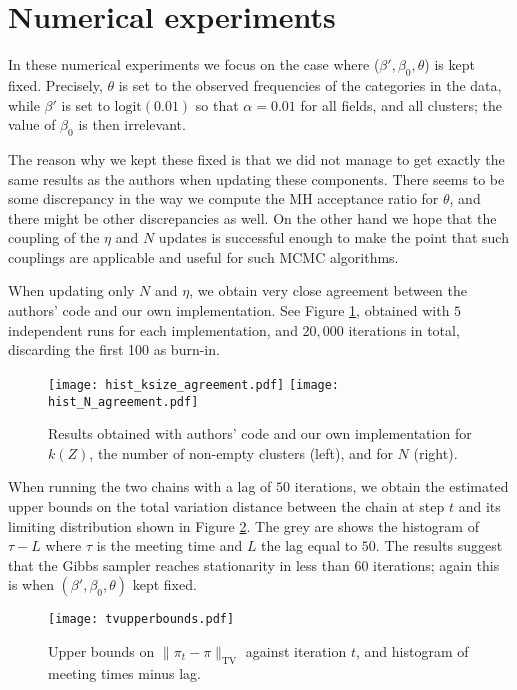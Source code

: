 \documentclass{article}
\begin{document}
\section{Numerical experiments}

In these numerical experiments we focus on 
the case where ($\beta',\beta_0,\theta$) is kept fixed.
Precisely, $\theta$ is set to the observed frequencies
of the categories in the data,
while $\beta'$ is set to $\text{logit}(0.01)$ so that
$\alpha = 0.01$ for all fields, and all clusters; the value
of $\beta_0$ is then irrelevant.

The reason why we kept these fixed is that we did not manage
to get exactly the same results as the authors when 
updating these components. There seems to be some discrepancy 
in the way we compute the MH acceptance ratio for $\theta$,
and there might be other discrepancies as well. On the other
hand we hope that the coupling of the $\eta$ and $N$
updates is successful enough to make the point that such 
couplings are applicable and useful for such MCMC algorithms.

When updating only $N$ and $\eta$,
we obtain very close agreement between the authors' code
and our own implementation. See Figure \ref{fig:agreementNksize},
obtained with $5$ independent runs for each implementation,
and $20,000$ iterations in total, discarding the first 100
as burn-in.

\begin{figure}
    \centering
    \texttt{[image: hist\_ksize\_agreement.pdf]}
    \hspace*{1cm}
    \texttt{[image: hist\_N\_agreement.pdf]}
    \caption{Results obtained with authors' code and our own implementation for $k(Z)$, the number of non-empty 
    clusters (left), and for $N$ (right).}
    \label{fig:agreementNksize}
\end{figure}

When running the two chains with a lag of $50$ iterations,
we obtain the estimated upper bounds on the total variation
distance between the chain at step $t$ and its limiting
distribution shown in Figure \ref{fig:tvupperbounds}.
The grey are shows the histogram of $\tau - L$ where
$\tau$ is the meeting time and $L$ the lag equal to  $50$.
The results suggest that the Gibbs sampler reaches
stationarity in less than 60 iterations; again this is 
when $(\beta',\beta_0,\theta)$ kept fixed.

\begin{figure}
    \centering
    \texttt{[image: tvupperbounds.pdf]}
    \caption{Upper bounds on $\|\pi_t - \pi\|_{\text{TV}}$ against iteration $t$, and histogram of meeting times minus lag.}
    \label{fig:tvupperbounds}
\end{figure}
\end{document}
